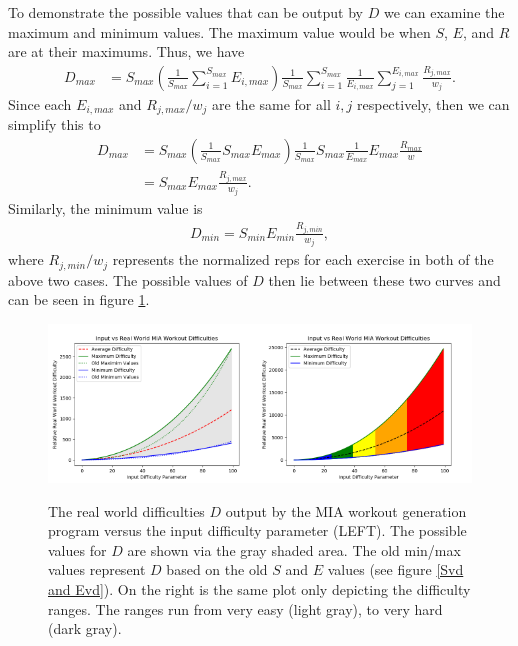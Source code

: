 To demonstrate the possible values that can be output by $D$ we can examine the maximum and minimum values. The maximum value would be when $S$, $E$, and $R$ are at their maximums. Thus, we have
\begin{align}
	D_{max} &= S_{max} \left(\frac{1}{S_{max}}\sum_{i=1}^{S_{max}}E_{i,max} \right)\frac{1}{S_{max}}\sum_{i=1}^{S_{max}}\frac{1}{E_{i,max}}\sum_{j=1}^{E_{i,max}}\frac{R_{j,max}}{w_j}.
\end{align}
Since each $E_{i,max}$ and $R_{j,max}/w_j$ are the same for all $i,j$ respectively, then we can simplify this to
\begin{align}
	D_{max} &= S_{max} \left(\frac{1}{S_{max}}S_{max}E_{max} \right)\frac{1}{S_{max}}S_{max}\frac{1}{E_{max}}E_{max}\frac{R_{max}}{w} \\
	&= S_{max} E_{max} \frac{R_{j,max}}{w_j}.
\end{align}
Similarly, the minimum value is 
\begin{align}
	D_{min} = S_{min} E_{min} \frac{R_{j,min}}{w_j},
\end{align}
where $R_{j,min}/w_j$ represents the normalized reps for each exercise in both of the above two cases. The possible values of $D$ then lie between these two curves and can be seen in figure \ref{Dvd}.

\begin{figure}[h]
	\centering
	\includegraphics[width=0.5\textwidth]{Images/Dvd.png}\includegraphics[width=0.5\textwidth]{Images/Dvdc.png}
	\caption{The real world difficulties $D$ output by the MIA workout generation program versus the input difficulty parameter (LEFT). The possible values for $D$ are shown via the gray shaded area. The old min/max values represent $D$ based on the old $S$ and $E$ values (see figure \ref{Svd and Evd}). On the right is the same plot only depicting the difficulty ranges. The ranges run from very easy (light gray), to very hard (dark gray).} \label{Dvd}
\end{figure}

